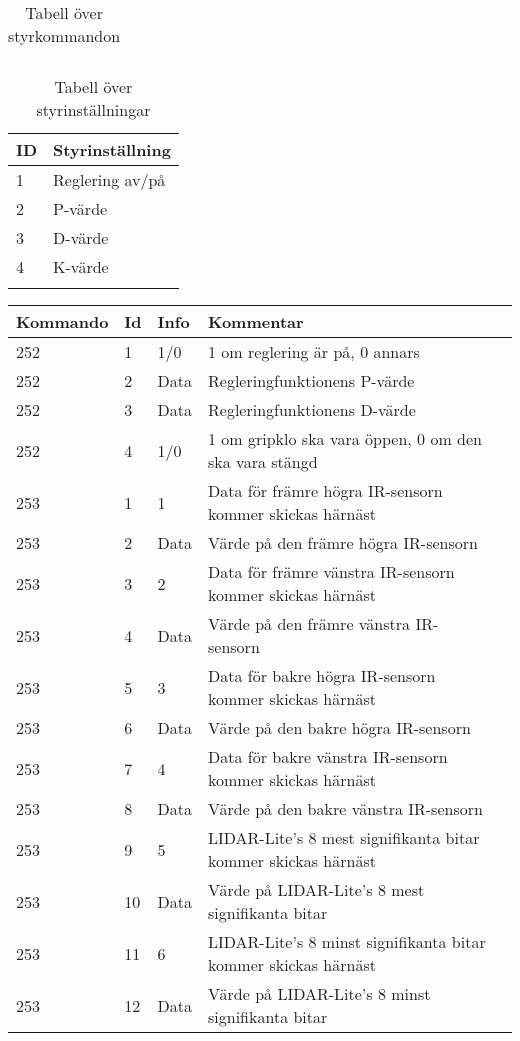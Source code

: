 \documentclass[11pt]{article}
\begin{document}
\begin{flushleft}
\begin{longtable}[l]{| l | l |}
\caption{Tabell över styrkommandon}\label{styrtab}
\end{longtable}

\begin{longtable}[l]{| l | l |} \hline
\textbf{ID} & \textbf{Styrinställning} \\ \hline 
1 & Reglering av/på \\ \hline
2 & P-värde \\ \hline
3 & D-värde \\ \hline
4 & K-värde \\ \hline

\caption{Tabell över styrinställningar}\label{styrinsttab}
\end{longtable}


\begin{table}[h]
\begin{tabular}{|l|l|l|l|l|} \hline

\textbf{Kommando} & \textbf{Id} & \textbf{Info} & \textbf{Kommentar}\\ \hline

252 & 1 & 1/0 & 1 om reglering är på, 0 annars \\ \hline
252 & 2 & Data & Regleringfunktionens P-värde \\ \hline
252 & 3 & Data & Regleringfunktionens D-värde \\ \hline
252 & 4 & 1/0 & 1 om gripklo ska vara öppen, 0 om den ska vara stängd \\ \hline


253 & 1 & 1 & Data för främre högra IR-sensorn kommer skickas härnäst \\ \hline
253 & 2 & Data & Värde på den främre högra IR-sensorn \\ \hline
253 & 3 & 2 & Data för främre vänstra IR-sensorn kommer skickas härnäst \\ \hline
253 & 4 & Data & Värde på den främre vänstra IR-sensorn \\ \hline
253 & 5 & 3 & Data för bakre högra IR-sensorn kommer skickas härnäst \\ \hline
253 & 6 & Data & Värde på den bakre högra IR-sensorn \\ \hline
253 & 7 & 4 & Data för bakre vänstra IR-sensorn kommer skickas härnäst \\ \hline
253 & 8 & Data & Värde på den bakre vänstra IR-sensorn \\ \hline

253 & 9 & 5 & LIDAR-Lite's 8 mest signifikanta bitar kommer skickas härnäst \\ \hline
253 & 10 & Data & Värde på LIDAR-Lite's 8 mest signifikanta bitar \\ \hline
253 & 11 & 6 & LIDAR-Lite's 8 minst signifikanta bitar kommer skickas härnäst \\ \hline
253 & 12 & Data & Värde på LIDAR-Lite's 8 minst signifikanta bitar \\ \hline


\end{tabular}
\end{table}
\end{flushleft}
\end{document}
